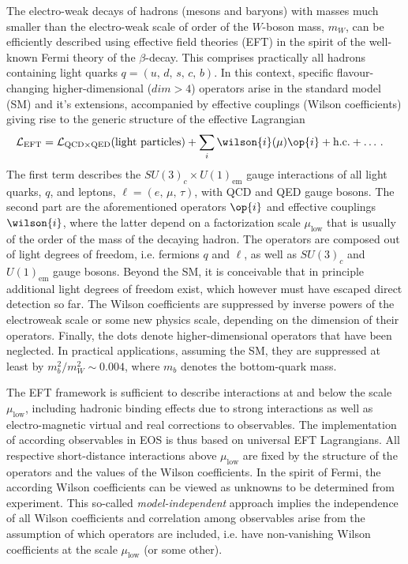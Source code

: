 The electro-weak decays of hadrons (mesons and baryons) with masses much smaller
than the electro-weak scale of order of the $W$-boson mass, $m_W$, can be efficiently
described using effective field theories (EFT) in the spirit of the well-known
Fermi theory of the $\beta$-decay. This comprises practically all hadrons containing
light quarks $q = (u,\,d,\,s,\,c,\,b)$. In this context, specific flavour-changing
higher-dimensional ($dim > 4$) operators arise in the standard model (SM) and
it's extensions, accompanied by effective couplings (Wilson coefficients) giving
rise to the generic structure of the effective Lagrangian
\begin{align}
  {\cal L}_{\text{EFT}} &
  = {\cal L}_{\text{QCD} \times \text{QED}} (\mbox{light particles})
  + \sum_i \wilson{i}(\mu) \op{i} + \mbox{h.c.} + \ldots \,.
\end{align} 
The first term describes the $SU(3)_c \times U(1)_\text{em}$
gauge interactions of all light quarks, $q$, and leptons, $\ell = (e,\,\mu,\,\tau)$,
with QCD and QED gauge bosons. The second part are the aforementioned operators
$\op{i}$ and effective couplings $\wilson{i}$, where the latter depend on a
factorization scale $\mu_\text{low}$ that is usually of the order of the mass of the
decaying hadron. The operators are composed out of light degrees of freedom, i.e. fermions
$q$ and $\ell$, as well as $SU(3)_c$ and $U(1)_\text{em}$ gauge bosons. Beyond
the SM, it is conceivable that in principle additional light degrees of freedom
exist, which however must have escaped direct detection so far.
The Wilson coefficients are suppressed by inverse powers of the electroweak
scale or some new physics scale, depending on the dimension of their operators.
Finally, the dots denote higher-dimensional operators that have been neglected.
In practical applications, assuming the SM, they are suppressed at least by
$m_b^2/m_W^2 \sim 0.004$, where $m_b$ denotes the bottom-quark mass.

The EFT framework is sufficient to describe interactions at and below the scale
$\mu_\text{low}$, including hadronic binding effects due to strong interactions
as well as electro-magnetic virtual and real corrections to observables. The
implementation of according observables in EOS is thus based on universal EFT 
Lagrangians. All respective short-distance interactions above $\mu_\text{low}$ are
fixed by the structure of the operators and the values of the Wilson coefficients.
In the spirit of Fermi, the according Wilson coefficients can be viewed as unknowns
to be determined from experiment. This so-called {\em model-independent} approach
implies the independence of all Wilson coefficients and correlation among observables
arise from the assumption of which operators are included, i.e. have non-vanishing
Wilson coefficients at the scale $\mu_\text{low}$ (or some other). 


